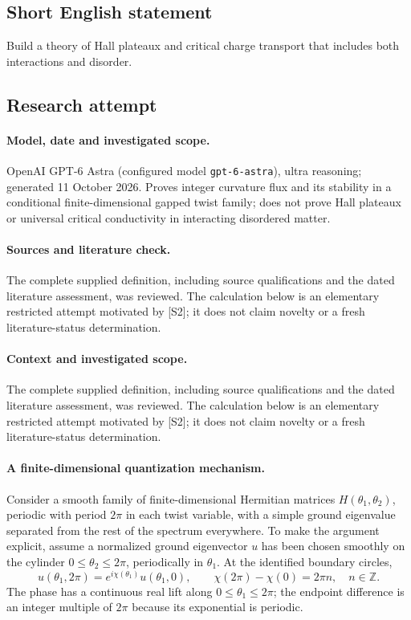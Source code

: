 \documentclass[11pt]{article}
\begin{document}
\subsection{Short English statement}
Build a theory of Hall plateaux and critical charge transport that includes both interactions and disorder.
\subsection{Research attempt}
\paragraph{Model, date and investigated scope.}
OpenAI GPT-6 Astra (configured model \texttt{gpt-6-astra}), ultra reasoning; generated 11 October 2026. Proves integer curvature flux and its stability in a conditional finite-dimensional gapped twist family; does not prove Hall plateaux or universal critical conductivity in interacting disordered matter.

\paragraph{Sources and literature check.}
The complete supplied definition, including source qualifications and the dated literature assessment, was reviewed. The calculation below is an elementary restricted attempt motivated by [S2]; it does not claim novelty or a fresh literature-status determination.

\paragraph{Context and investigated scope.} The complete supplied definition, including source qualifications and the dated literature assessment, was reviewed. The calculation below is an elementary restricted attempt motivated by [S2]; it does not claim novelty or a fresh literature-status determination.

\paragraph{A finite-dimensional quantization mechanism.}
Consider a smooth family of finite-dimensional Hermitian matrices $H(\theta_1,\theta_2)$, periodic with period $2\pi$ in each twist variable, with a simple ground eigenvalue separated from the rest of the spectrum everywhere. To make the argument explicit, assume a normalized ground eigenvector $u$ has been chosen smoothly on the cylinder $0\leq\theta_2\leq2\pi$, periodically in $\theta_1$. At the identified boundary circles,
\[
 u(\theta_1,2\pi)=e^{i\chi(\theta_1)}u(\theta_1,0),
 \qquad \chi(2\pi)-\chi(0)=2\pi n,\quad n\in\mathbb Z.
\]
The phase has a continuous real lift along $0\leq\theta_1\leq2\pi$; the endpoint difference is an integer multiple of $2\pi$ because its exponential is periodic.
\end{document}
